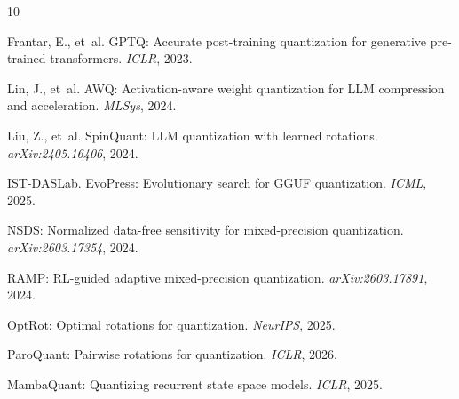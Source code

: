 \documentclass[10pt,a4paper]{article}
\begin{document}
\begin{thebibliography}{10}

 Frantar, E., et~al. GPTQ: Accurate post-training quantization for generative pre-trained transformers. \emph{ICLR}, 2023.

 Lin, J., et~al. AWQ: Activation-aware weight quantization for LLM compression and acceleration. \emph{MLSys}, 2024.

 Liu, Z., et~al. SpinQuant: LLM quantization with learned rotations. \emph{arXiv:2405.16406}, 2024.

 IST-DASLab. EvoPress: Evolutionary search for GGUF quantization. \emph{ICML}, 2025.

 NSDS: Normalized data-free sensitivity for mixed-precision quantization. \emph{arXiv:2603.17354}, 2024.

 RAMP: RL-guided adaptive mixed-precision quantization. \emph{arXiv:2603.17891}, 2024.

 OptRot: Optimal rotations for quantization. \emph{NeurIPS}, 2025.

 ParoQuant: Pairwise rotations for quantization. \emph{ICLR}, 2026.

 MambaQuant: Quantizing recurrent state space models. \emph{ICLR}, 2025.

\end{thebibliography}
\end{document}
